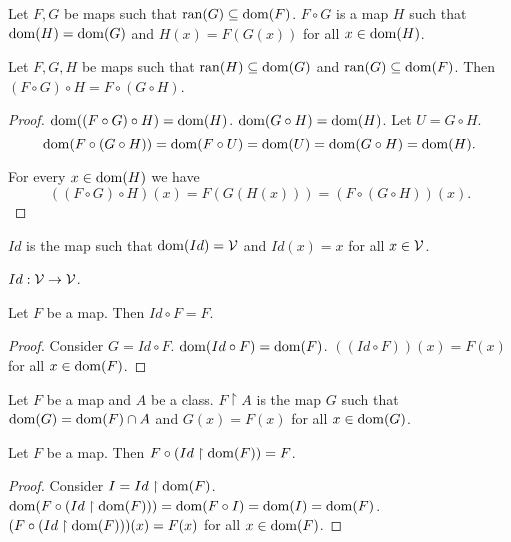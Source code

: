 \documentclass{article}
\begin{document}
\begin{forthel}
\begin{signature}
Let $F,G$ be maps such that $\operatorname{ran}(G) \subseteq \operatorname{dom}(F)$.
$F \circ G$ is a map $H$ such that $\operatorname{dom}(H) = \operatorname{dom}(G)$ and
$H(x) = F(G(x))$ for all $x \in \operatorname{dom}(H)$.
\end{signature}

\begin{lemma}
Let $F,G,H$ be maps such that $\operatorname{ran}(H) \subseteq \operatorname{dom}(G)$ and
$\operatorname{ran}(G) \subseteq \operatorname{dom}(F)$.
Then $(F \circ G) \circ H = F \circ (G \circ H)$.
\end{lemma}
\begin{proof}
$\operatorname{dom}((F \circ G) \circ H) = \operatorname{dom}(H)$.
$\operatorname{dom}(G \circ H) = \operatorname{dom}(H)$. Let $U = G \circ H$.
$$\operatorname{dom}(F \circ (G \circ H)) =
\operatorname{dom}(F \circ U) = \operatorname{dom}(U) = \operatorname{dom}(G \circ H) = \operatorname{dom}(H).$$

For every $x \in \operatorname{dom}(H)$ we have
$$((F \circ G) \circ H)(x) = F(G(H(x))) =
(F \circ (G \circ H))(x).$$
\end{proof}

\begin{signature}
$Id$ is the map such that $\operatorname{dom}(Id) = {\cal V}$
and $Id(x) = x$ for all $x \in {\cal V}$.
\end{signature}

\begin{lemma}
$Id : {\cal V} \rightarrow {\cal V}$.
\end{lemma}

\begin{lemma}
Let $F$ be a map. Then $Id \circ F = F$.
\end{lemma}
\begin{proof} Consider $G = Id \circ F$.
$\operatorname{dom}(Id \circ F) = \operatorname{dom}(F)$.
$((Id \circ F))(x) = F(x)$ for all $x \in \operatorname{dom}(F)$.
\end{proof}

\begin{signature}
Let $F$ be a map and $A$ be a class.
$F\upharpoonright A$ is the map $G$ such that
$\operatorname{dom}(G) = \operatorname{dom}(F) \cap A$ and $G(x)=F(x)$
for all $x \in \operatorname{dom}(G)$.
\end{signature}

\begin{lemma}
Let $F$ be a map. Then $F \circ (Id \upharpoonright \operatorname{dom}(F)) = F$.
\end{lemma}
\begin{proof} Consider $I = Id \upharpoonright \operatorname{dom}(F)$.
$\operatorname{dom}(F \circ (Id \upharpoonright \operatorname{dom}(F))) =
\operatorname{dom}(F \circ I) = \operatorname{dom}(I) = \operatorname{dom}(F)$.
$(F \circ (Id \upharpoonright \operatorname{dom}(F)))(x) = F(x)$
for all $x \in \operatorname{dom}(F)$.
\end{proof}

\end{forthel}
\end{document}
